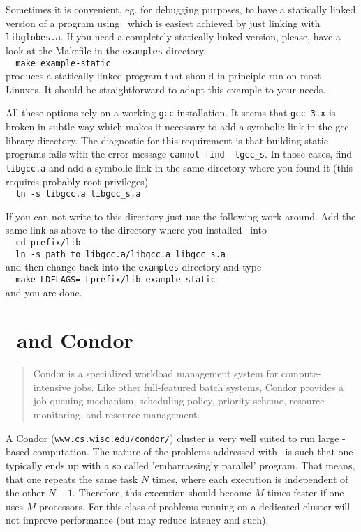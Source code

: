 \begin{appendix}
Sometimes it is convenient, eg. for debugging purposes, to have a
statically linked version of a program using \GLOBES\, which is easiest
achieved by just linking with \verb+libglobes.a+. If you need a completely
statically linked version, please, have a look at the Makefile in the
\verb+examples+ directory.\\
\verb+  make example-static+\\ 
produces a statically linked program that should in principle run on
most Linuxes.  It should be straightforward to adapt this example to
your needs.

All these options rely on a working \verb+gcc+ installation. It seems that
\verb+gcc 3.x+ is broken in subtle way which makes it necessary to add a
symbolic link in the gcc library directory. The diagnostic for this
requirement is that building static programs fails with the error
message \verb+cannot find -lgcc_s+. In those cases, find \verb+libgcc.a+ and add
a symbolic link in the same directory where you found it (this
requires probably root privileges)\\
\verb+  ln -s libgcc.a libgcc_s.a+

If you can not write to this directory just use the following work
around. Add the same link as above to the directory where you
installed \GLOBES\ into\\
\verb+  cd prefix/lib+\\       
\verb+  ln -s path_to_libgcc.a/libgcc.a libgcc_s.a+\\
and then change back into the \verb+examples+ directory and type\\
\verb+  make LDFLAGS=-Lprefix/lib example-static+\\
and you are done.

\section*{\GLOBES\ and Condor}
\begin{quote}
  Condor is a specialized workload management system for
  compute-intensive jobs. Like other full-featured batch systems,
  Condor provides a job queuing mechanism, scheduling policy,
  priority scheme, resource monitoring, and resource management.
\end{quote} 

A Condor (\verb+www.cs.wisc.edu/condor/+) cluster is very well suited
to run large \GLOBES-based computation. The nature of the problems
addressed with \GLOBES\ is such that one typically ends up with a so
called 'embarrassingly parallel' program. That means, that one repeats
the same task $N$ times, where each execution is independent of the
other $N-1$. Therefore, this execution should become $M$ times faster
if one uses $M$ processors. For this class of problems running on a
dedicated cluster will not improve performance (but may reduce latency
and such).


\end{appendix}
